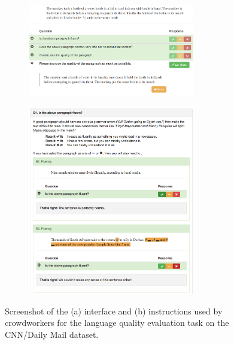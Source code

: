 \begin{figure}
  \begin{subfigure}{\textwidth}
    \centering
    \includegraphics[width=0.8\textwidth]{figures/edit}
    \caption{\label{fig:lqual-interface}}
  \end{subfigure}
  \begin{subfigure}{\textwidth}
    \centering
    \includegraphics[width=0.8\textwidth]{figures/lqual_tutorial}
    \caption{\label{fig:lqual-tutorial}}
  \end{subfigure}
  \caption{Screenshot of the (a) interface and (b) instructions used by crowdworkers for the language quality evaluation task on the CNN/Daily Mail dataset.}
\end{figure}

